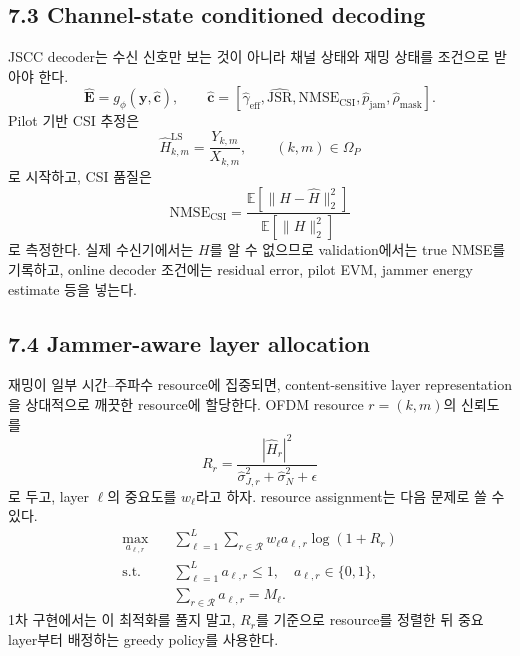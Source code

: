 \documentclass[11pt,a4paper]{article}
\begin{document}
\subsection{7.3 Channel-state conditioned decoding}
JSCC decoder는 수신 신호만 보는 것이 아니라 채널 상태와 재밍 상태를 조건으로 받아야 한다.
\begin{equation}
    \hat{\bm{E}}=g_{\phi}(\bm{y},\hat{\bm{c}}), \qquad
    \hat{\bm{c}}=[\hat{\gamma}_{\mathrm{eff}},\widehat{\mathrm{JSR}},\mathrm{NMSE}_{\mathrm{CSI}},\hat{p}_{\mathrm{jam}},\hat{\rho}_{\mathrm{mask}}].
\end{equation}
Pilot 기반 CSI 추정은
\begin{equation}
    \hat{H}_{k,m}^{\mathrm{LS}}=\frac{Y_{k,m}}{X_{k,m}}, \qquad (k,m)\in\Omega_P
\end{equation}
로 시작하고, CSI 품질은
\begin{equation}
    \mathrm{NMSE}_{\mathrm{CSI}}=\frac{\mathbb{E}\left[\|H-\hat{H}\|_2^2\right]}{\mathbb{E}\left[\|H\|_2^2\right]}
\end{equation}
로 측정한다. 실제 수신기에서는 $H$를 알 수 없으므로 validation에서는 true NMSE를 기록하고, online decoder 조건에는 residual error, pilot EVM, jammer energy estimate 등을 넣는다.

\subsection{7.4 Jammer-aware layer allocation}
재밍이 일부 시간--주파수 resource에 집중되면, content-sensitive layer representation을 상대적으로 깨끗한 resource에 할당한다. OFDM resource $r=(k,m)$의 신뢰도를
\begin{equation}
    R_r=\frac{|\hat{H}_r|^2}{\hat{\sigma}_{J,r}^2+\hat{\sigma}_{N}^2+\epsilon}
\end{equation}
로 두고, layer $\ell$의 중요도를 $w_{\ell}$라고 하자. resource assignment는 다음 문제로 쓸 수 있다.
\begin{equation}
\begin{aligned}
    \max_{a_{\ell,r}}\quad & \sum_{\ell=1}^{L}\sum_{r\in\mathcal{R}} w_{\ell}a_{\ell,r}\log(1+R_r)\\
    \mathrm{s.t.}\quad & \sum_{\ell=1}^{L}a_{\ell,r}\le 1,\quad a_{\ell,r}\in\{0,1\},\\
    & \sum_{r\in\mathcal{R}}a_{\ell,r}=M_{\ell}.
\end{aligned}
\end{equation}
1차 구현에서는 이 최적화를 풀지 말고, $R_r$를 기준으로 resource를 정렬한 뒤 중요 layer부터 배정하는 greedy policy를 사용한다.
\end{document}
